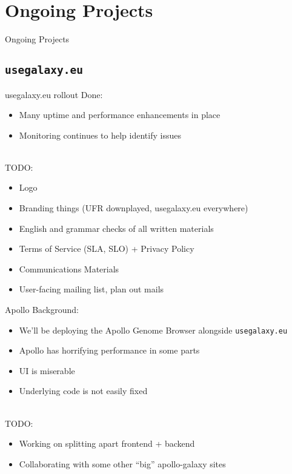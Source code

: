 \documentclass[12pt]{ufrslides}
\begin{document}
\section[Ongoing]{Ongoing Projects}
\begin{frame}{Ongoing Projects}
\end{frame}

\subsection[FR Galaxy]{\texttt{usegalaxy.eu}}

	\begin{frame}{usegalaxy.eu rollout}
		Done:
		\begin{itemize}
			\item Many uptime and performance enhancements in place
			\item Monitoring continues to help identify issues
		\end{itemize}
		\ \\[0.5cm]
		TODO:
		\begin{itemize}
			\item Logo
			\item Branding things (UFR downplayed, usegalaxy.eu everywhere)
			\item English and grammar checks of all written materials
			\item Terms of Service (SLA, SLO) + Privacy Policy
			\item Communications Materials
			\item User-facing mailing list, plan out mails
		\end{itemize}
	\end{frame}

	\begin{frame}{Apollo}
		Background:
		\begin{itemize}
			\item We'll be deploying the Apollo Genome Browser alongside \texttt{usegalaxy.eu}
			\item Apollo has horrifying performance in some parts
			\item UI is miserable
			\item Underlying code is not easily fixed
		\end{itemize}
		\ \\[0.5cm]
		TODO:
		\begin{itemize}
			\item Working on splitting apart frontend + backend
			\item Collaborating with some other ``big'' apollo-galaxy sites
		\end{itemize}
	\end{frame}
\end{document}
